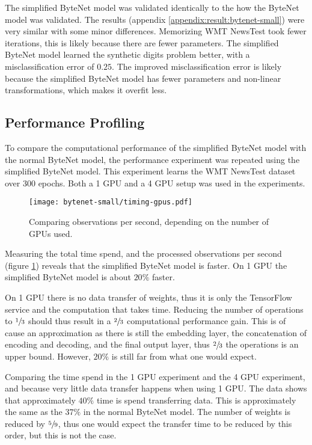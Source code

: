 The simplified ByteNet model was validated identically to the how the ByteNet model was validated. The results (appendix \ref{appendix:result:bytenet-small}) were very similar with some minor differences. Memorizing WMT NewsTest took fewer iterations, this is likely because there are fewer parameters. The simplified ByteNet model learned the synthetic digits problem better, with a misclassification error of $0.25$. The improved misclassification error is likely because the simplified ByteNet model has fewer parameters and non-linear transformations, which makes it overfit less.

\subsection{Performance Profiling}

To compare the computational performance of the simplified ByteNet model with the normal ByteNet model, the performance experiment was repeated using the simplified ByteNet model. This experiment learns the WMT NewsTest dataset over 300 epochs. Both a 1 GPU and a 4 GPU setup was used in the experiments.

\begin{figure}[h]
    \centering
    \texttt{[image: bytenet-small/timing-gpus.pdf]}
    \caption{Comparing observations per second, depending on the number of GPUs used.}
    \label{fig:result:simple-bytenet:timing-gpus}
\end{figure}

Measuring the total time spend, and the processed observations per second (figure \ref{fig:result:simple-bytenet:timing-gpus}) reveals that the simplified ByteNet model is faster. On 1 GPU the simplified ByteNet model is about $20\%$ faster.

On 1 GPU there is no data transfer of weights, thus it is only the TensorFlow service and the computation that takes time. Reducing the number of operations to $\sfrac{1}{3}$ should thus result in a $\sfrac{2}{3}$ computational performance gain. This is of cause an approximation as there is still the embedding layer, the concatenation of encoding and decoding, and the final output layer, thus $\sfrac{2}{3}$ the operations is an upper bound. However, $20\%$ is still far from what one would expect.

Comparing the time spend in the 1 GPU experiment and the 4 GPU experiment, and because very little data transfer happens when using 1 GPU. The data shows that approximately $40\%$ time is spend transferring data. This is approximately the same as the $37\%$ in the normal ByteNet model. The number of weights is reduced by $\sfrac{5}{9}$, thus one would expect the transfer time to be reduced by this order, but this is not the case.

